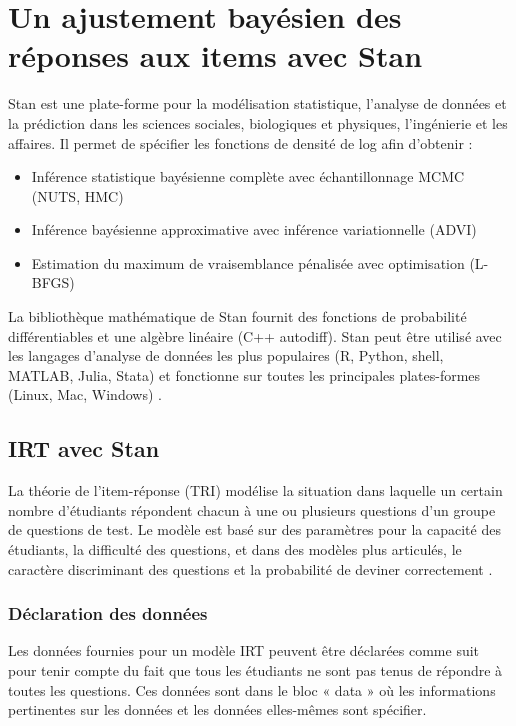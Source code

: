 
\section{Un ajustement bayésien des réponses aux items avec Stan}
Stan est une plate-forme pour la modélisation statistique, l'analyse de données et la prédiction dans les sciences sociales, biologiques et physiques, l'ingénierie et les affaires.
Il permet de spécifier les fonctions de densité de log afin d’obtenir :

\begin{itemize}
	\item Inférence statistique bayésienne complète avec échantillonnage MCMC (NUTS, HMC)
	\item Inférence bayésienne approximative avec inférence variationnelle (ADVI)
	\item Estimation du maximum de vraisemblance pénalisée avec optimisation (L-BFGS)
\end{itemize}

\noindent La bibliothèque mathématique de Stan fournit des fonctions de probabilité différentiables et une algèbre linéaire (C++ autodiff).
Stan peut être utilisé avec les langages d'analyse de données les plus populaires (R, Python, shell, MATLAB, Julia, Stata) et fonctionne sur toutes les principales plates-formes (Linux, Mac, Windows) \cite{stan}.

\subsection{IRT avec Stan}
La théorie de l'item-réponse (TRI) modélise la situation dans laquelle un certain nombre d'étudiants répondent chacun à une ou plusieurs questions d'un groupe de questions de test. Le modèle est basé sur des paramètres pour la capacité des étudiants, la difficulté des questions, et dans des modèles plus articulés, le caractère discriminant des questions et la probabilité de deviner correctement \cite{data_analysis_irt}.

\subsubsection{Déclaration des données}
Les données fournies pour un modèle IRT peuvent être déclarées comme suit pour tenir compte du fait que tous les étudiants ne sont pas tenus de répondre à toutes les questions. Ces données sont dans le bloc « data » où les informations pertinentes sur les données et les données elles-mêmes sont spécifier.


